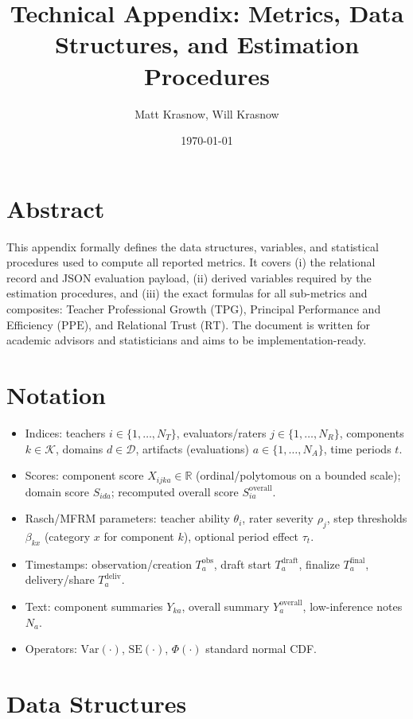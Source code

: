 \documentclass[11pt]{article}
\title{Technical Appendix: Metrics, Data Structures, and Estimation Procedures}
\author{Matt Krasnow, Will Krasnow}
\date{\today}
\newcommand{\TPG}{\mathrm{TPG}}
\newcommand{\PPE}{\mathrm{PPE}}
\newcommand{\RT}{\mathrm{RT}}
\newcommand{\Var}{\mathrm{Var}}
\newcommand{\SE}{\mathrm{SE}}
\begin{document}
\maketitle
\tableofcontents

\section*{Abstract}
This appendix formally defines the data structures, variables, and statistical procedures used to compute all reported metrics. It covers (i) the relational record and JSON evaluation payload, (ii) derived variables required by the estimation procedures, and (iii) the exact formulas for all sub-metrics and composites: Teacher Professional Growth ($\TPG$), Principal Performance and Efficiency ($\PPE$), and Relational Trust ($\RT$). The document is written for academic advisors and statisticians and aims to be implementation-ready.

\section{Notation}
\begin{itemize}[leftmargin=2em]
  \item Indices: teachers $i \in \{1,\dots,N_T\}$, evaluators/raters $j \in \{1,\dots,N_R\}$, components $k \in \mathcal{K}$, domains $d \in \mathcal{D}$, artifacts (evaluations) $a \in \{1,\dots,N_A\}$, time periods $t$.
  \item Scores: component score $X_{i j k a} \in \mathbb{R}$ (ordinal/polytomous on a bounded scale); domain score $S_{i d a}$; recomputed overall score $S^{\mathrm{overall}}_{i a}$.
  \item Rasch/MFRM parameters: teacher ability $\theta_i$, rater severity $\rho_j$, step thresholds $\beta_{k x}$ (category $x$ for component $k$), optional period effect $\tau_t$.
  \item Timestamps: observation/creation $T^{\mathrm{obs}}_a$, draft start $T^{\mathrm{draft}}_a$, finalize $T^{\mathrm{final}}_a$, delivery/share $T^{\mathrm{deliv}}_a$.
  \item Text: component summaries $Y_{k a}$, overall summary $Y^{\mathrm{overall}}_a$, low-inference notes $N_a$.
  \item Operators: $\Var(\cdot)$, $\SE(\cdot)$, $\Phi(\cdot)$ standard normal CDF.
\end{itemize}

\section{Data Structures}
\end{document}
